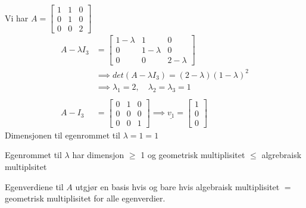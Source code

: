 \documentclass[11pt, a4paper, norsk]{article}
\begin{document}
        \begin{Example}{}{}
            Vi har $A = \begin{bmatrix}
                1 & 1 & 0 \\
                0 & 1 & 0 \\
                0 & 0 & 2
            \end{bmatrix}$
            \begin{align*}
                A - \lambda I_3 &= \begin{bmatrix}
                    1 - \lambda & 1 & 0 \\
                    0 & 1 - \lambda & 0 \\
                    0 & 0 & 2 - \lambda 
                \end{bmatrix}
                \\
                                &\implies det(A - \lambda I_3) = (2-\lambda)(1-\lambda)^2 
                                \\
                                &\implies \lambda_1 = 2, \quad \lambda_2 = \lambda_3 = 1
                                \\
                                \\
                    A - I_3 &= \begin{bmatrix}
                        0 & 1 & 0 \\
                        0 & 0 & 0 \\
                        0 & 0 & 1
                    \end{bmatrix} \implies \underline{v_1} = \begin{bmatrix}
                        1 \\
                        0 \\
                        0
                    \end{bmatrix}
            \end{align*}
            Dimensjonen til egenrommet til $\lambda = 1 = 1$
        \end{Example}
        
        \begin{Theorem}{}{}
            Egenrommet til $\lambda$ har dimensjon $\ge$ 1 og geometrisk multiplisitet $\le$ algrebraisk multiplsitet
        \end{Theorem}

        \begin{Theorem}{}{}
            Egenverdiene til $A$ utgjør en basis hvis og bare hvis algebraisk multiplisitet $=$ geometrisk multiplisitet for alle egenverdier.
        \end{Theorem}
\end{document}
